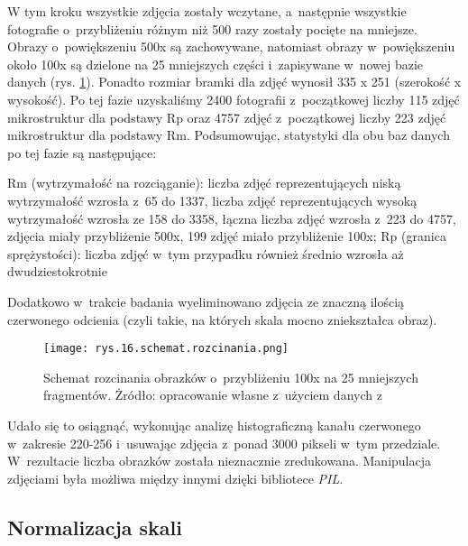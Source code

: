 W tym kroku wszystkie zdjęcia zostały wczytane, a~następnie wszystkie fotografie o~przybliżeniu różnym niż 500 razy zostały pocięte na mniejsze. Obrazy o~powiększeniu 500x są zachowywane, natomiast obrazy w~powiększeniu około 100x są dzielone na 25 mniejszych części i~zapisywane w~nowej bazie danych (rys. \ref{fig:mesh16}). Ponadto rozmiar bramki dla zdjęć wynosił 335 x 251 (szerokość x  wysokość). Po tej fazie uzyskaliśmy 2400 fotografii z~początkowej liczby 115 zdjęć mikrostruktur dla podstawy Rp oraz 4757 zdjęć z~początkowej liczby 223 zdjęć mikrostruktur dla podstawy Rm. Podsumowując, statystyki dla obu baz danych po tej fazie są następujące:
\begin{outline}
	\1 Rm (wytrzymałość na rozciąganie):
		\2 liczba zdjęć reprezentujących niską wytrzymałość wzrosła z~65 do 1337,
		\2 liczba zdjęć reprezentujących wysoką wytrzymałość wzrosła ze 158 do 3358,
		\2 łączna liczba zdjęć wzrosła z~223 do 4757,
		 zdjęcia miały przybliżenie 500x, 199 zdjęć miało przybliżenie 100x;
	\1 Rp (granica sprężystości):
		\2 liczba zdjęć w~tym przypadku również średnio wzrosła aż dwudziestokrotnie
\end{outline}
Dodatkowo w~trakcie badania wyeliminowano zdjęcia ze znaczną ilością czerwonego odcienia (czyli takie, na których skala mocno zniekształca obraz).
\begin{figure}[h]
    \centering
    \texttt{[image: rys.16.schemat.rozcinania.png]}
    \caption{Schemat rozcinania obrazków o~przybliżeniu 100x na 25 mniejszych fragmentów. Żródło: opracowanie własne z~użyciem danych z~\cite{Pirowski17}}
    \label{fig:mesh16}
\end{figure}
Udało się to osiągnąć, wykonując analizę histograficzną kanału czerwonego w~zakresie 220-256 i~usuwając zdjęcia z~ponad 3000 pikseli w~tym przedziale. W~rezultacie liczba obrazków została nieznacznie zredukowana. Manipulacja zdjęciami była możliwa między innymi dzięki bibliotece \textit{PIL}.


\subsection{Normalizacja skali}
\label{sec:normalizacja_skali}

